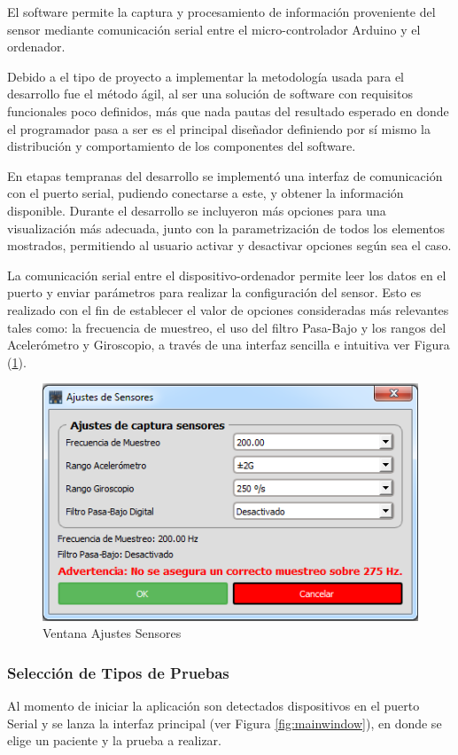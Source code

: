 \documentclass[12pt,a4paper]{article}
\begin{document}
El software permite la captura y procesamiento de información proveniente del sensor mediante comunicación serial entre el micro-controlador Arduino y el ordenador.

Debido a el tipo de proyecto a implementar la metodología usada para el desarrollo fue el método ágil, al ser una solución de software con requisitos funcionales poco definidos, más que nada pautas del resultado esperado en donde el programador pasa a ser es el principal diseñador definiendo por sí mismo la distribución y comportamiento de los componentes del software.

En etapas tempranas del desarrollo se implementó una interfaz de comunicación con el puerto serial, pudiendo conectarse a este, y obtener la información disponible.
Durante el desarrollo se incluyeron más opciones para una visualización más adecuada, junto con la parametrización de todos los elementos mostrados, permitiendo al usuario activar y desactivar opciones según sea el caso.

La comunicación serial entre el dispositivo-ordenador permite leer los datos en el puerto y enviar parámetros para realizar la configuración del sensor.
Esto es realizado con el fin de establecer el valor de opciones consideradas más relevantes tales como: la frecuencia de muestreo, el uso del filtro Pasa-Bajo y los rangos del Acelerómetro y Giroscopio, a través de una interfaz sencilla e intuitiva ver Figura (\ref{fig:ajustessensores}).

\begin{figure}[H]
	\centering
	\includegraphics[scale=0.6]{images/ajustesSensores}
	\caption{Ventana Ajustes Sensores}
	\label{fig:ajustessensores}
\end{figure}

\newpage
\subsubsection{Selección de Tipos de Pruebas}
Al momento de iniciar la aplicación son detectados dispositivos en el puerto Serial y se lanza la interfaz principal (ver Figura \ref{fig:mainwindow}), en donde se elige un paciente y la prueba a realizar.
\end{document}
